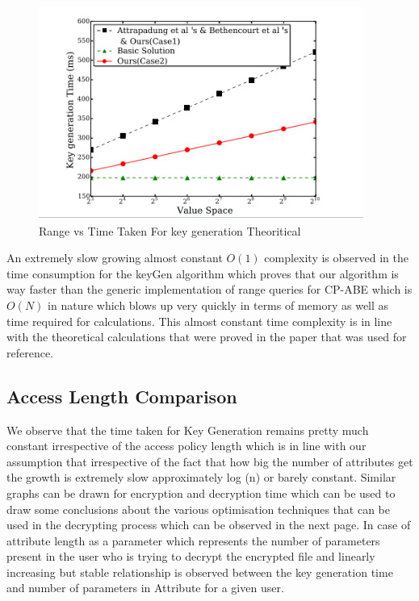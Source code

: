 \begin{figure}[h]
    \centering
    \includegraphics[width=0.75\linewidth]{Images/RangeVsKeyGenTheoritical.jpeg}
    \caption{Range vs Time Taken For key generation Theoritical}
    \label{fig:enter-label}
\end{figure}

An extremely slow growing almost constant \(O(1)\) complexity is observed in the time consumption for the keyGen algorithm which proves that our algorithm is way faster than the generic implementation of range queries for CP-ABE which is \(O(N)\) in nature which blows up very quickly in terms of memory as well as time required for calculations.
This almost constant time complexity is in line with the theoretical calculations that were proved in the paper that was used for reference.


\subsection{Access Length Comparison}
We observe that the time taken for Key Generation remains pretty much constant irrespective of the access policy length which is in line with our assumption that irrespective of the fact that how big the number of attributes get the growth is extremely slow approximately log (n) or barely constant. 
Similar graphs can be drawn for encryption and decryption time which can be used to draw some conclusions about the various optimisation techniques that can be used in the decrypting process which can be observed in the next page.
In case of attribute length as  a parameter which represents the number of parameters present in the user who is trying to decrypt the encrypted file and linearly increasing but stable relationship is observed between the key generation time and number of parameters in Attribute for a given user.

